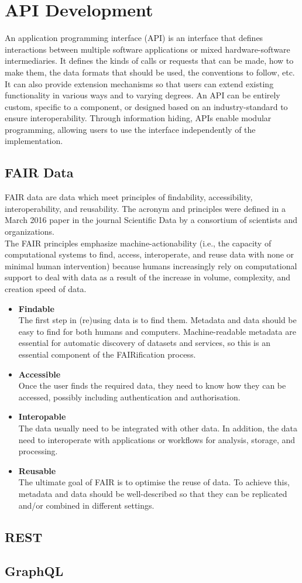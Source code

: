 \chapter{API Development}

An application programming interface (API) is an interface that
defines interactions between multiple software applications or
mixed hardware-software intermediaries. It defines the kinds of calls
or requests that can be made, how to make them, the data formats
that should be used, the conventions to follow, etc. It can also
provide extension mechanisms so that users can extend existing
functionality in various ways and to varying degrees. An API can be
entirely custom, specific to a component, or designed based on an
industry-standard to ensure interoperability. Through information hiding,
APIs enable modular programming, allowing users to use the interface
independently of the implementation.

\section{FAIR Data}
FAIR data are data which meet principles of findability,
accessibility, interoperability, and reusability.
The acronym and principles were defined in a March 2016 paper in the
journal Scientific Data by a consortium of scientists and organizations.\\

The FAIR principles emphasize machine-actionability (i.e., the capacity of
computational systems to find, access, interoperate, and reuse data
with none or minimal human intervention) because humans increasingly
rely on computational support to deal with data as a result of the
increase in volume, complexity, and creation speed of data.\\

\begin{itemize}
\item \textbf{Findable}\\
The first step in (re)using data is to find them. Metadata and data
should be easy to find for both humans and computers. Machine-readable
metadata are essential for automatic discovery of datasets and services,
so this is an essential component of the FAIRification process.
\item \textbf{Accessible}\\
Once the user finds the required data, they need to know how they can be
accessed, possibly including authentication and authorisation.
\item \textbf{Interopable}\\
The data usually need to be integrated with other data. In addition, the data
need to interoperate with applications or workflows for analysis, storage,
and processing.
\item \textbf{Reusable}\\
The ultimate goal of FAIR is to optimise the reuse of data. To achieve
this, metadata and data should be well-described so that they can be
replicated and/or combined in different settings.
\end{itemize}



\section{REST}

\section{GraphQL}
